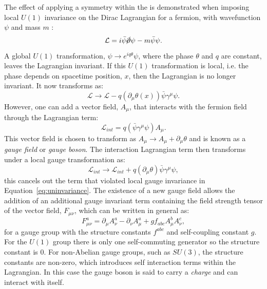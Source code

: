 The effect of applying a symmetry within the \SM is demonstrated when
imposing local $U(1)$ invariance on the Dirac Lagrangian for a
fermion, with wavefunction $\psi$ and mass $m$ \cite{Griffiths:111880}:
\begin{equation}
\mathcal{L}=i\bar{\psi}\cancel{\partial}\psi-m\bar{\psi}\psi.
\end{equation}
A global $U(1)$ transformation, $\psi\rightarrow e^{iq\theta}\psi$,
where the phase $\theta$ and $q$ are constant,
leaves the Lagrangian invariant. If this $U(1)$ transformation is
local, i.e. the phase depends on spacetime position, $x$, then the
Lagrangian is no longer invariant. It now transforms as:
\begin{equation}
\label{eq:uninvariance}
\mathcal{L}\rightarrow\mathcal{L}-q(\partial_{\mu}\theta(x))\bar{\psi}\gamma^{\mu}\psi.
\end{equation}
However, one can add a vector field, $A_{\mu}$, that interacts with
the fermion field through the Lagrangian term:
\begin{equation}
\mathcal{L}_{int}=q(\bar{\psi}\gamma^{\mu}\psi) A_{\mu}.
\end{equation}
This vector field is chosen to transform as $A_{\mu}\rightarrow
A_{\mu}+\partial_{\mu}\theta$ and is known as a \emph{gauge field} or
\emph{gauge boson}. The interaction Lagrangian term then transforms
under a local gauge transformation as:
\begin{equation}
\mathcal{L}_{int}\rightarrow \mathcal{L}_{int}+q(\partial_{\mu}\theta)\bar{\psi}\gamma^{\mu}\psi,
\end{equation}
this cancels out the term that violated local gauge invariance in
Equation~\ref{eq:uninvariance}. The existence of a new gauge field
allows the addition of an additional gauge invariant term containing
the field strength tensor of the vector field, $F_{\mu\nu}$, which can
be written in general as:
\begin{equation}
F_{\mu\nu}^a=\partial_{\mu}A_{\nu}^a-\partial_{\nu}A_{\mu}^a+gf_{abc}A_{\mu}^{b}A_{\nu}^{c},
\end{equation}
for a gauge group with the structure constants $f^{abc}$ and
self-coupling constant $g$. For
the $U(1)$ group there is only one self-commuting generator so the
structure constant is 0. For non-Abelian gauge groups, such as
$SU(3)$, the structure constants are non-zero, which introduces
self interaction terms within the Lagrangian. In this case the gauge
boson is said to carry a \emph{charge} and can interact with itself.

